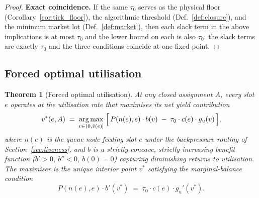 \documentclass[11pt,twocolumn,a4paper]{article}
\theoremstyle{plain}
\newtheorem{theorem}{Theorem}[section]
\theoremstyle{definition}
\theoremstyle{remark}
\newcommand{\tick}{\tau_0}
\newcommand{\pres}{P}
\DeclareMathOperator*{\argmax}{arg\,max}
\begin{document}
\begin{proof}
\medskip
\noindent\textbf{Exact coincidence.} If the same $\tick$ serves as the physical floor (Corollary~\ref{cor:tick_floor}), the algorithmic threshold (Def.~\ref{def:closure}), and the minimum market lot (Def.~\ref{def:market}), then each slack term in the above implications is at most $\tick$ and the lower bound on each is also $\tick$: the slack terms are exactly $\tick$ and the three conditions coincide at one fixed point.
\end{proof}

\subsection{Forced optimal utilisation}

\begin{theorem}[Forced optimal utilisation]
\label{thm:forcedutil}
At any closed assignment $A$, every slot $e$ operates at the utilisation rate that maximises its \emph{net} yield contribution
\[
  v^*(e, A) \;=\; \argmax_{v \in (0,\bar{v}(e)]}\;
  \Bigl[\, \pres(n(e), e)\cdot b(v)\;-\;\tick\cdot c(e)\cdot g_u(v)\,\Bigr],
\]
where $n(e)$ is the queue node feeding slot $e$ under the backpressure routing of Section~\ref{sec:liveness}, and $b$ is a strictly concave, strictly increasing \emph{benefit} function ($b'>0$, $b''<0$, $b(0)=0$) capturing diminishing returns to utilisation. The maximiser is the unique interior point $v^*$ satisfying the marginal-balance condition
\[
  \pres(n(e), e)\cdot b'(v^*) \;=\; \tick\cdot c(e)\cdot g_u'(v^*).
\]
\end{theorem}
\end{document}
